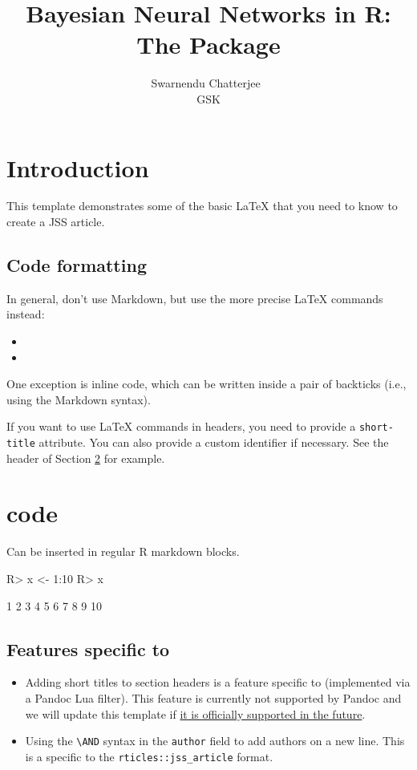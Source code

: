 \documentclass[
]{jss}
\author{
Swarnendu Chatterjee~\orcidlink{0000-0000-0000-0000}\\GSK
}
\title{Bayesian Neural Networks in R: The \pkg{bnns} Package}
\providecommand{\tightlist}{%
  \setlength{\itemsep}{0pt}\setlength{\parskip}{0pt}}
\begin{document}
\section{Introduction}\label{introduction}

This template demonstrates some of the basic LaTeX that you need to know
to create a JSS article.

\subsection{Code formatting}\label{code-formatting}

In general, don't use Markdown, but use the more precise LaTeX commands
instead:

\begin{itemize}
\item
\item
\end{itemize}

One exception is inline code, which can be written inside a pair of
backticks (i.e., using the Markdown syntax).

If you want to use LaTeX commands in headers, you need to provide a
\texttt{short-title} attribute. You can also provide a custom identifier
if necessary. See the header of Section \ref{r-code} for example.

\section[R code]{ code}\label{r-code}

Can be inserted in regular R markdown blocks.

\begin{CodeChunk}
\begin{CodeInput}
R> x <- 1:10
R> x
\end{CodeInput}
\begin{CodeOutput}
 [1]  1  2  3  4  5  6  7  8  9 10
\end{CodeOutput}
\end{CodeChunk}

\subsection[Features specific to rticles]{Features specific to
}\label{features-specific-to}

\begin{itemize}
\tightlist
\item
  Adding short titles to section headers is a feature specific to
   (implemented via a Pandoc Lua filter). This feature is
  currently not supported by Pandoc and we will update this template if
  \href{https://github.com/jgm/pandoc/issues/4409}{it is officially
  supported in the future}.
\item
  Using the \texttt{\textbackslash{}AND} syntax in the \texttt{author}
  field to add authors on a new line. This is a specific to the
  \texttt{rticles::jss\_article} format.
\end{itemize}
\end{document}
